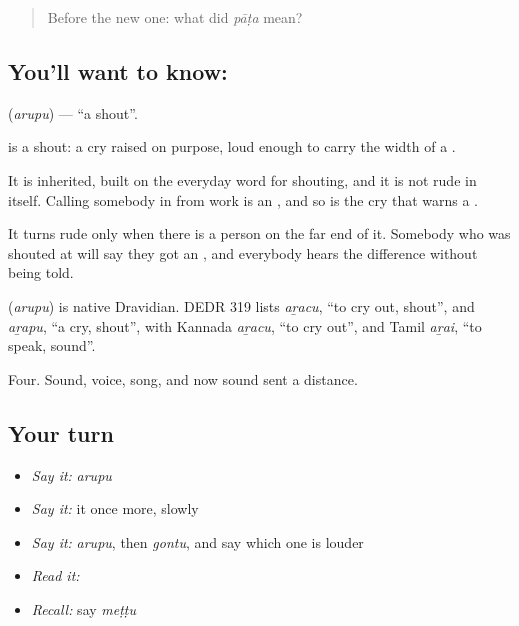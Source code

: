 \label{lesson:TE-C68-shout}



\begin{quote}
Before the new one: what did \emph{pāṭa} mean?
\end{quote}

\subsection*{You'll want to know: }
\textbf{} (\emph{arupu}) — \textquotedblleft{}a shout\textquotedblright{}.

 is a shout: a cry raised on purpose, loud enough to carry the width of a .

It is inherited, built on the everyday word for shouting, and it is not rude in itself. Calling somebody in from work is an , and so is the cry that warns a .

It turns rude only when there is a person on the far end of it. Somebody who was shouted at will say they got an , and everybody hears the difference without being told.

\begin{cousinweb}
\textbf{} (\emph{arupu}) is native Dravidian. DEDR 319 lists \emph{aṟacu}, \textquotedblleft{}to cry out, shout\textquotedblright{}, and \emph{aṟapu}, \textquotedblleft{}a cry, shout\textquotedblright{}, with Kannada \emph{aṟacu}, \textquotedblleft{}to cry out\textquotedblright{}, and Tamil \emph{aṟai}, \textquotedblleft{}to speak, sound\textquotedblright{}.
\end{cousinweb}

\begin{grammarlens}[title={What you've built}]
Four. Sound, voice, song, and now sound sent a distance.
\end{grammarlens}

\subsection*{Your turn}
\begin{itemize}
\raggedright
  \item \emph{Say it:} \emph{arupu}
  \item \emph{Say it:} it once more, slowly
  \item \emph{Say it:} \emph{arupu}, then \emph{gontu}, and say which one is louder
  \item \emph{Read it:} \textbf{}
  \item \emph{Recall:} say \emph{meṭṭu}
\end{itemize}

